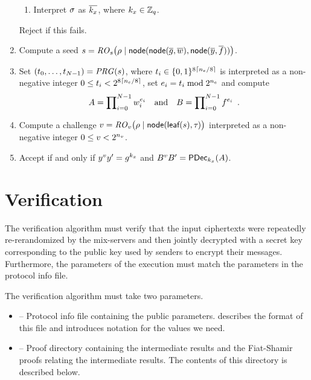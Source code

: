 \documentclass[11pt]{article}
\begin{document}
\begin{nicebox}
\begin{algorithm}
\begin{enumerate}
\begin{enumerate}
      \item Interpret $\sigma_{}$ as $\overline{k_{x}}$, where
        $k_{x}\in\mathbb{Z}_{q}$.

      \end{enumerate}
      Reject if this fails.

    \item Compute a seed
      $s=\mathit{RO}_s\big(\rho\mid\textsf{node}(\textsf{node}(\overline{g},\overline{w}),\textsf{node}(\overline{y},\overline{f}))\big)$.

    \item Set $(t_0,\ldots,t_{N-1})=\mathit{PRG}(s)$, where
      $t_i\in\{0,1\}^{8\lceil{n_e}/8\rceil}$ is interpreted as a
      non-negative integer $0\leq t_i<2^{8\lceil{n_e}/8\rceil}$, set $e_i=t_i\bmod 2^{{n_e}}$ and compute
      \begin{align*}
        A=\prod\nolimits_{i=0}^{N-1}w_{i}^{e_i}\quad\text{and}\quad
        B=\prod\nolimits_{i=0}^{N-1}f^{e_i}\enspace .
      \end{align*}

    \item Compute a challenge
      $v=\mathit{RO}_v\big(\rho\mid\textsf{node}(\textsf{leaf}(s),\tau_{})\big)$ interpreted as a
      non-negative integer $0\leq v<2^{n_v}$.

    \item Accept if and only if $y^vy'=g^{k_{x}}$ and
      $B^vB'=\textsf{PDec}_{k_{x}}(A)$.

    \end{enumerate}

\end{algorithm}
\end{nicebox}


\section{Verification}\label{sect:verify}

The verification algorithm must verify that the input ciphertexts were
repeatedly re-rerandomized by the mix-servers and then jointly
decrypted with a secret key corresponding to the public key used by
senders to encrypt their messages. Furthermore, the parameters of the
execution must match the parameters in the protocol info file.

The verification algorithm must take two parameters.
\begin{itemize}

\item {} -- Protocol info file containing the
  public parameters.  describes the format of this
  file and  introduces notation for the values we
  need.
    
\item {} -- Proof directory containing the intermediate
  results and the Fiat-Shamir proofs relating the intermediate
  results. The contents of this directory is described below.
 
\end{itemize}
\end{document}
